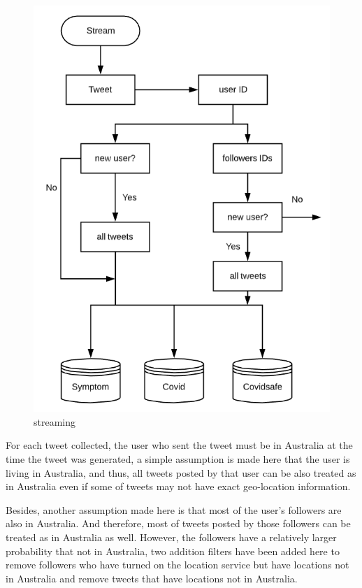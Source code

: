 \begin{figure}[h!]
\centering
\includegraphics[scale=0.4]{city_analytics/report/images/stream.png}
\caption{streaming}
\label{fig:stream}
\end{figure}


For each tweet collected, the user who sent the tweet must be in Australia at the time the tweet was generated, a simple assumption is made here that the user is living in Australia, and thus, all tweets posted by that user can be also treated as in Australia even if some of tweets may not have exact geo-location information. 

Besides, another assumption made here is that most of the user's followers are also in Australia. And therefore, most of tweets posted by those followers can be treated as in Australia as well. However, the followers have a relatively larger probability that not in Australia, two addition filters have been added here to remove followers who have turned on the location service but have locations not in Australia and remove tweets that have locations not in Australia.

